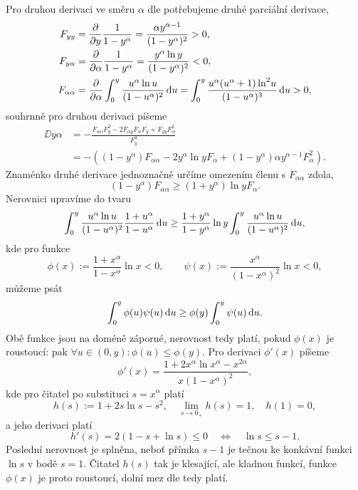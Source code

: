 Pro druhou derivaci ve směru $\alpha$ dle  potřebujeme druhé parciální derivace,
\begin{align}
    F_{yy}&=\frac{\partial }{\partial y}\frac{1}{1-y^{\alpha}}=\frac{\alpha y^{\alpha-1}}{(1-y^\alpha)^2}>0,
    \\
    F_{y\alpha}&=\frac{\partial }{\partial \alpha}\frac{1}{1-y^{\alpha}}=\frac{y^\alpha \ln{y}}{(1-y^\alpha)^2}<0,
    \\
    F_{\alpha\alpha}&=\frac{\partial }{\partial \alpha}\int_0^y \frac{u^\alpha \ln{u}}{(1-u^\alpha)^2}\,\mathrm{d}{u}=\int_0^y\frac{u^\alpha(u^\alpha+1)\ln^2\!{u}}{(1-u^\alpha)^3}\,\mathrm{d}{u}>0,
\end{align}
souhrnně pro druhou derivaci píšeme
\begin{align}
    \DD{y}{\alpha}&=-\frac{F_{\alpha\alpha}F_y^2-2F_{\alpha y}F_\alpha F_y+F_{yy}F_\alpha^2}{F_y^3}\nonumber \\
    &=-\left((1-y^\alpha)F_{\alpha\alpha}-2{y^\alpha \ln{y}}F_\alpha+(1-y^\alpha)\alpha y^{\alpha-1}F_\alpha^2
    \right).
\end{align}
Znaménko druhé derivace jednoznačně určíme omezením členu s $F_{\alpha\alpha}$ zdola,
\begin{equation}\label{eq:second_derivative_lower_bound}
    (1-y^\alpha)F_{\alpha\alpha}\geq (1+y^\alpha)\ln{y}F_\alpha.
\end{equation}
Nerovnici upravíme do tvaru
\begin{equation}
    \int_0^y\frac{u^{\alpha}\ln{u}}{(1-u^\alpha)^2}\frac{1+u^\alpha}{1-u^\alpha}\,\mathrm{d}{u}\geq\frac{1+y^\alpha}{1-y^\alpha}\ln{y}\int_0^y\frac{u^\alpha\ln{u}}{(1-u^\alpha)^2}\,\mathrm{d}{u},
\end{equation}
kde pro funkce 
\begin{equation}
    \phi(x):=\frac{1+x^\alpha}{1-x^\alpha}\ln{x}<0,\qquad \psi(x):=\frac{x^\alpha}{(1-x^\alpha)^2}\ln{x}<0,
\end{equation}
můžeme psát
\begin{equation}
    \int_0^y \phi(u)\psi(u)\,\mathrm{d}{u}\geq\phi(y)\int_0^y\psi(u)\,\mathrm{d}{u}.
\end{equation}
Obě funkce jsou na doméně záporné, nerovnost tedy platí, pokud $\phi(x)$ je roustoucí: pak $\forall u\in(0,y): \phi(u)\leq\phi(y)$. Pro derivaci $\phi'(x)$ píšeme
\begin{equation}
    \phi'(x)=\frac{1+2x^\alpha\ln{x^\alpha}-x^{2\alpha}}{x(1-x^\alpha)^2},
\end{equation}
kde pro čitatel po substituci $s=x^\alpha$ platí
\begin{equation}
    h(s):=1+2s\ln{s}-s^2,\quad\lim_{s\to0_+}h(s)=1,\quad h(1)=0,
\end{equation}
a jeho derivaci platí
\begin{equation}
    h'(s)=2(1-s+\ln{s})\leq0\quad\Longleftrightarrow\quad\ln{s}\leq s-1.
\end{equation}
Poslední nerovnost je splněna, neboť přímka $s-1$ je tečnou ke konkávní funkci $\ln{s}$ v bodě $s=1$. Čitatel $h(s)$ tak je klesající, ale kladnou funkcí, funkce $\phi(x)$ je proto roustoucí, dolní mez dle  tedy platí. 


